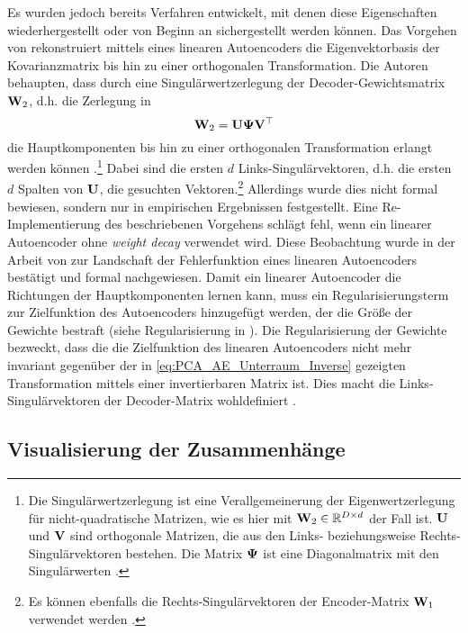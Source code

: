 Es wurden jedoch bereits Verfahren entwickelt, mit denen diese Eigenschaften wiederhergestellt oder
von Beginn an sichergestellt werden können. Das Vorgehen von \textcite{Plaut.2018} rekonstruiert
mittels eines linearen Autoencoders die Eigenvektorbasis der Kovarianzmatrix bis hin zu einer
orthogonalen Transformation. Die Autoren behaupten, dass durch eine Singulärwertzerlegung der
Decoder-Gewichtsmatrix $\mathbf{W}_2$, d.h. die Zerlegung in
\begin{equation}
	\label{eq:SVD}
	\mathbf{W}_2 = \mathbf{U} \mathbf{\Psi} \mathbf{V}^\top
\end{equation}
die Hauptkomponenten bis hin zu einer orthogonalen Transformation erlangt werden können \parencite[4]{Plaut.2018}.\footnote{Die Singulärwertzerlegung ist eine Verallgemeinerung der
	Eigenwertzerlegung für nicht-quadratische Matrizen, wie es hier mit $\mathbf{W}_2 \in \mathbb{R}^{D \times
			d}$ der Fall ist. $\mathbf{U}$ und $\mathbf{V}$ sind orthogonale Matrizen, die aus den Links-
	beziehungsweise Rechts-Singulärvektoren bestehen. Die Matrix $\mathbf{\Psi}$ ist eine Diagonalmatrix
	mit den Singulärwerten \parencite[44 -- 45]{Goodfellow.2016}. } Dabei sind die ersten $d$ Links-Singulärvektoren, d.h. die
ersten $d$ Spalten von $\mathbf{U}$, die gesuchten Vektoren.\footnote{Es können ebenfalls die
	Rechts-Singulärvektoren der Encoder-Matrix $\mathbf{W}_1$ verwendet werden \parencite[4]{Plaut.2018}.} Allerdings wurde dies nicht formal bewiesen, sondern nur in empirischen
Ergebnissen festgestellt. Eine Re-Implementierung des beschriebenen Vorgehens schlägt fehl, wenn
ein linearer Autoencoder ohne \textit{weight decay} verwendet wird. Diese Beobachtung wurde in der
Arbeit von \textcite{Kunin.2019} zur Landschaft der Fehlerfunktion eines linearen Autoencoders
bestätigt und formal nachgewiesen. Damit ein linearer Autoencoder die Richtungen der
Hauptkomponenten lernen kann, muss ein Regularisierungsterm zur Zielfunktion des Autoencoders
hinzugefügt werden, der die Größe der Gewichte bestraft (siehe Regularisierung in
). Die Regularisierung der Gewichte bezweckt, dass die die
Zielfunktion des linearen Autoencoders nicht mehr invariant gegenüber der in
\eqref{eq:PCA_AE_Unterraum_Inverse} gezeigten Transformation mittels einer invertierbaren Matrix
ist. Dies macht die Links-Singulärvektoren der Decoder-Matrix wohldefiniert \parencite[3]{Kunin.2019}.

\subsection{Visualisierung der Zusammenhänge}

